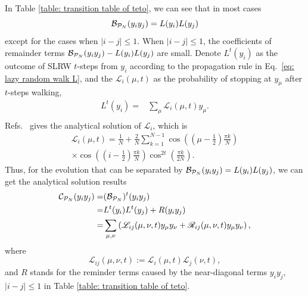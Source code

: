\documentclass[showpacs,twocolumn,aps,prx,long bibliography,superscriptaddress,notitlepage]{revtex4-1}
\begin{document}
In Table \ref{table: transition table of teto}, we can see that in most cases 
\begin{equation}
    \mathcal{B}_{\mathcal{P}_N}(y_i y_j) = L(y_i) L(y_j)
\end{equation}
except for the cases when $|i-j|\leq 1$. 
When $|i-j|\leq 1$, the coefficients of remainder terms $\mathcal{B}_{\mathcal{P}_N}(y_i y_j) - L(y_i)L(y_j)$ are small. 
Denote $L^t(y_i)$ as the outcome of SLRW $t$-steps from $y_i$ according to the propagation rule in Eq.~\eqref{eq: lazy random walk L}, and the $\mathcal{L}_{i}(\mu, t)$ as the probability of stopping at $y_\mu$ after $t$-steps walking,
\begin{equation}
    \begin{aligned}
    L^t(y_i) =& \sum_\mu \mathcal{L}_{i}(\mu, t) y_\mu. \\
    \end{aligned}
\end{equation}
Refs.~\cite{giuggioli2020exact} gives the analytical solution of $\mathcal{L}_{i}$, which is 
\begin{equation}
    \begin{aligned}
        \mathcal{L}_{i}(\mu, t) = \frac{1}{N} + \frac{2}{N} \sum_{k=1}^{N-1} \cos \left(\left(\mu-\frac{1}{2}\right) \frac{\pi k}{N}\right)  \\
        \times \cos \left(\left(i-\frac{1}{2}\right) \frac{\pi k}{N}\right) \cos^{2 t} \left(\frac{\pi k}{2 N}\right).
    \end{aligned}
\end{equation}
Thus, for the evolution that can be separated by $\mathcal{B}_{\mathcal{P}_N}(y_iy_j) = L(y_i) L(y_j)$, we can get the analytical solution results
\begin{align}
    \mathcal{C}_{\mathcal{P}_N} (y_i y_j) =& (\mathcal{B}_{\mathcal{P}_N})^t (y_i y_j) \\
    =& L^t(y_i)L^t(y_j) + R(y_iy_j)\\
    \label{eq: zz anonymous 7}
    =&\sum_{\mu,\nu} \left(\mathscr{L}_{ij} (\mu, \nu, t) y_\mu y_\nu + \mathscr{R}_{ij} (\mu, \nu, t) y_\mu y_\nu\right),
\end{align}
where
\begin{equation}
    \mathscr{L}_{ij} (\mu, \nu, t) := \mathcal{L}_{i}(\mu, t)\mathcal{L}_{j}(\nu, t),
    \label{eq:L_ij_deviation}
\end{equation}
and $R$ stands for the reminder terms caused by the near-diagonal terms $y_i y_j$, $|i-j| \leq 1$ in Table \ref{table: transition table of teto}. 
\end{document}
